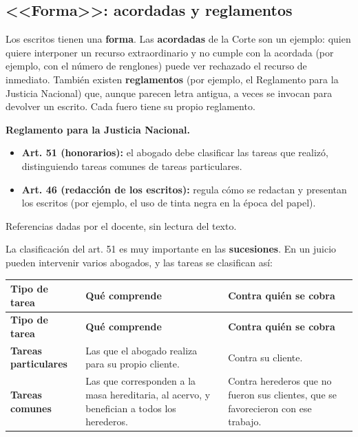 \documentclass[12pt,oneside]{book}
\begin{document}
\subsection{<<Forma>>: acordadas y reglamentos}

Los escritos tienen una \textbf{forma}. Las \textbf{acordadas} de la Corte son un ejemplo: quien quiere interponer un recurso extraordinario y no cumple con la acordada (por ejemplo, con el número de renglones) puede ver rechazado el recurso de inmediato. También existen \textbf{reglamentos} (por ejemplo, el Reglamento para la Justicia Nacional) que, aunque parecen letra antigua, a veces se invocan para devolver un escrito. Cada fuero tiene su propio reglamento.

\begin{note}
\textbf{Reglamento para la Justicia Nacional.}
\begin{itemize}
    \item \textbf{Art. 51 (honorarios):} el abogado debe clasificar las tareas que realizó, distinguiendo tareas comunes de tareas particulares.
    \item \textbf{Art. 46 (redacción de los escritos):} regula cómo se redactan y presentan los escritos (por ejemplo, el uso de tinta negra en la época del papel).
\end{itemize}
Referencias dadas por el docente, sin lectura del texto.
\end{note}

La clasificación del art. 51 es muy importante en las \textbf{sucesiones}. En un juicio pueden intervenir varios abogados, y las tareas se clasifican así:

\begin{longtable}{@{}L{0.20\textwidth}L{0.36\textwidth}L{0.34\textwidth}@{}}
\toprule
\textbf{Tipo de tarea} & \textbf{Qué comprende} & \textbf{Contra quién se cobra} \\
\midrule
\endfirsthead
\toprule
\textbf{Tipo de tarea} & \textbf{Qué comprende} & \textbf{Contra quién se cobra} \\
\midrule
\endhead
\bottomrule
\endlastfoot
\textbf{Tareas particulares} & Las que el abogado realiza para su propio cliente. & Contra su cliente. \\
\textbf{Tareas comunes} & Las que corresponden a la masa hereditaria, al acervo, y benefician a todos los herederos. & Contra herederos que no fueron sus clientes, que se favorecieron con ese trabajo. \\
\end{longtable}
\end{document}
